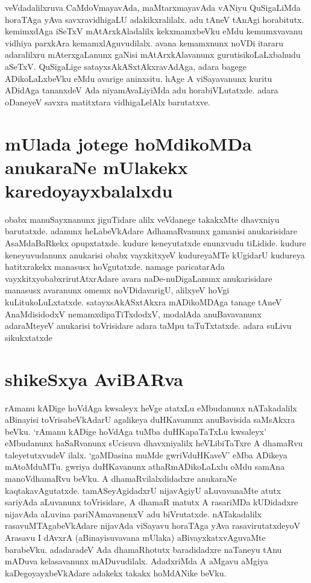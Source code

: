 veVdadalilxruva CaMdoVmayavAda, maMtarxmayavAda vANiyu QuSigaLiMda horaTAga yAva savxravidhigaLU adakikxralilalx. adu tAneV tAnAgi horabitutx. kemimxdAga iSeTxV mAtArxkAladalilx  kekxmamxbeVku eMdu kemumxvavanu vidhiya parxkAra kemamxlAguvudilalx. avana kemamxnunx noVDi itararu adaralilxru mAterxgaLanunx  gaNisi mAtArxkAlavanunx  gurutisikoLaLxbahudu aSeTxV. QuSigaLige satayxsAkASxtAkxravAdAga, adara bagege ADikoLaLxbeVku  eMdu avarige aninxsitu. hAge A viSayavanunx kuritu ADidAga tananxdeV Ada niyamAvaLiyiMda adu horabiVLutatxde. adara oDaneyeV savxra matitxtara vidhigaLelAlx barutatxve.

\section*{mUlada jotege hoMdikoMDa anukaraNe mUlakekx  karedoyayxbalalxdu}

obabx manuSayxnanunx jiguTidare alilx veVdanege takakxMte dhavxniyu barutatxde. adanunx heLabeVkAdare AdhamaRvanunx gamanisi anukarisidare AsaMdaBaRkekx  opupxtatxde. kudure keneyutatxde enunxvudu tiLidide. kudure keneyuvudanunx anukarisi obabx vayxkitxyeV kudureyaMTe kUgidarU kudureya hatitxrakekx manasusx  hoVgutatxde. namage paricatarAda vayxkitxyobabxrirutAtxrAdare avara naDe-nuDigaLanunx anukarisidare manasusx avaranunx omemx  noVDidavarigU, alilxyeV hoVgi kuLitukoLuLxtatxde. satayxsAkASxtAkxra mADikoMDAga tanage tAneV AnaMdisidodxV nemamxdipaTiTxdodxV, modalAda anuBavavanunx  adaraMteyeV anukarisi toVrisidare adara taMpu taTuTxtatxde. adara suLivu sikukxtatxde

\section*{shikeSxya AviBARva}

rAmanu kADige hoVdAga  kwsaleyx  heVge atatxLu eMbudanunx nATakadalilx aBinayisi toVrisabeVkAdarU agalikeya duHKavanunx anuBavisida saMsAkxra beVku. `rAmanu kADige hoVdAga tuMba duHKapaTaTxLu kwsaleyx' eMbudanunx  haSaRvanunx sUcisuva dhavxniyalilx heVLibiTaTxre  A dhamaRvu taleyetutxvudeV ilalx. `gaMDasina muMde gwriVduHKaveV' eMba ADikeya mAtoMduMTu. gwriya duHKavanunx athaRmADikoLaLxlu oMdu samAna manoVdhamaRvu beVku. A dhamaRvilalxdidadxre anukaraNe kaqtakavAgutatxde. tamASeyAgidadxrU nijavAgiyU aLuvavanaMte atutx  sariyAda aLuvanunx  toVrisidare, A dhamaR matutx A rasariMDa kUDidadxre nijavAda aLuvina pariNAmavanenxV adu biVrutatxde. nATakadalilx rasavuMTAgabeVkAdare nijavAda viSayavu horaTAga yAva rasavirutatxdeyoV Arasavu I dAvxrA (aBinayisuvavana mUlaka) aBivayxkatxvAguvaMte barabeVku. adadaradeV Ada dhamaRhotutx baradidadxre naTaneyu tAnu mADuva kelasavanunx  mADuvudilalx. AdadxriMda A aMgavu aMgiya kaDegoyayxbeVkAdare adakekx takakx hoMdANike beVku. 

